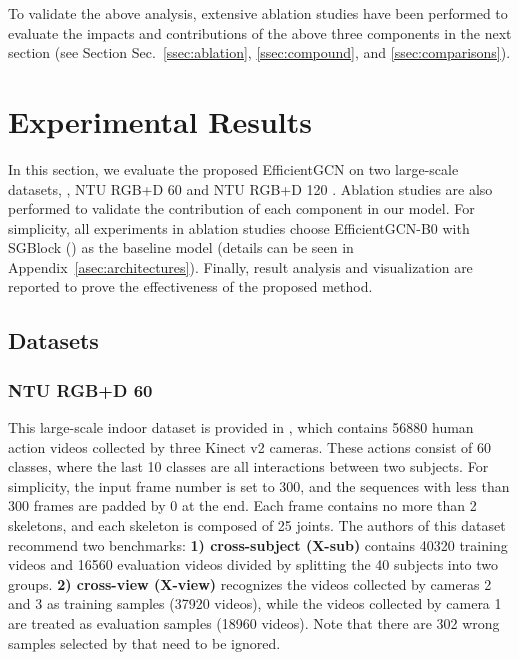 \documentclass[10pt,journal,compsoc]{IEEEtran}
\begin{document}
To validate the above analysis, extensive ablation studies have been performed to evaluate the impacts and contributions of the above three components in the next section (see Section Sec.~\ref{ssec:ablation}, \ref{ssec:compound}, and \ref{ssec:comparisons}).

\section{Experimental Results}
\label{sec:experiments}

In this section, we evaluate the proposed EfficientGCN on two large-scale datasets, \ie, NTU RGB+D 60 \cite{shahroudy2016ntu} and NTU RGB+D 120 \cite{liu2019ntu}. Ablation studies are also performed to validate the contribution of each component in our model. For simplicity, all experiments in ablation studies choose EfficientGCN-B0 with SGBlock () as the baseline model (details can be seen in Appendix~\ref{asec:architectures}). Finally, result analysis and visualization are reported to prove the effectiveness of the proposed method.

\subsection{Datasets}
\label{ssec:datasets}

\subsubsection{NTU RGB+D 60}
\label{sssec:dataset_ntu60}

This large-scale indoor dataset is provided in \cite{shahroudy2016ntu}, which contains 56880 human action videos collected by three Kinect v2 cameras. These actions consist of 60 classes, where the last 10 classes are all interactions between two subjects. For simplicity, the input frame number is set to 300, and the sequences with less than 300 frames are padded by 0 at the end. Each frame contains no more than 2 skeletons, and each skeleton is composed of 25 joints. The authors of this dataset recommend two benchmarks: {\bf 1) cross-subject (X-sub)} contains 40320 training videos and 16560 evaluation videos divided by splitting the 40 subjects into two groups. {\bf 2) cross-view (X-view)} recognizes the videos collected by cameras 2 and 3 as training samples (37920 videos), while the videos collected by camera 1 are treated as evaluation samples (18960 videos). Note that there are 302 wrong samples selected by \cite{liu2019ntu} that need to be ignored.
\end{document}
